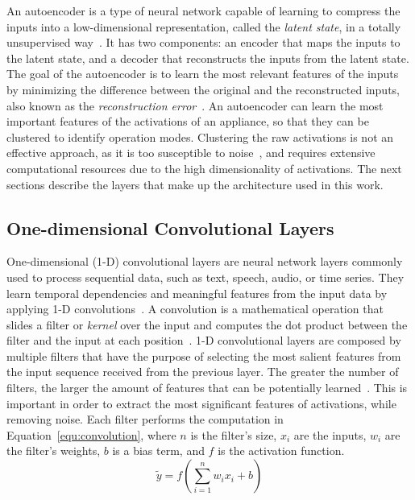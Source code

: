 An autoencoder is a type of neural network capable of learning to compress the inputs into a low-dimensional representation, called the \textit{latent state}, in a totally unsupervised way~\parencite{hinton_reducing_2006}. It has two components: an encoder that maps the inputs to the latent state, and a decoder that reconstructs the inputs from the latent state. The goal of the autoencoder is to learn the most relevant features of the inputs by minimizing the difference between the original and the reconstructed inputs, also known as the \textit{reconstruction error}~\parencite{hinton_reducing_2006}. An autoencoder can learn the most important features of the activations of an appliance, so that they can be clustered to identify operation modes. Clustering the raw activations is not an effective approach, as it is too susceptible to noise~\parencite{castangia_clustering_2023}, and requires extensive computational resources due to the high dimensionality of activations. The next sections describe the layers that make up the architecture used in this work.

\subsection{One-dimensional Convolutional Layers}

One-dimensional (1-D) convolutional layers are neural network layers commonly used to process sequential data, such as text, speech, audio, or time series. They learn temporal dependencies and meaningful features from the input data by applying 1-D convolutions~\parencite{kiranyaz_1d_2021}. A convolution is a mathematical operation that slides a filter or \textit{kernel} over the input and computes the dot product between the filter and the input at each position~\parencite{rudin_functional_1973}. 1-D convolutional layers are composed by multiple filters that have the purpose of selecting the most salient features from the input sequence received from the previous layer. The greater the number of filters, the larger the amount of features that can be potentially learned~\parencite{castangia_clustering_2023}. This is important in order to extract the most significant features of activations, while removing noise. Each filter performs the computation in Equation~\eqref{equ:convolution}, where $n$ is the filter's size, $x_i$ are the inputs, $w_i$ are the filter's weights, $b$ is a bias term, and $f$ is the activation function.
\begin{equation}\label{equ:convolution}
  \tilde{y} = f(\sum_{i=1}^{n}{w_i x_i} + b)
\end{equation}

